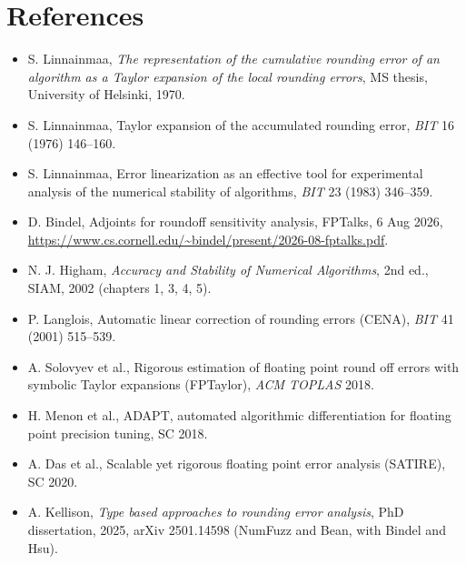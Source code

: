\documentclass[11pt]{article}
\begin{document}
\section*{References}
\begin{itemize}
\item S. Linnainmaa, \emph{The representation of the cumulative rounding error of an algorithm as a Taylor expansion of the local rounding errors}, MS thesis, University of Helsinki, 1970.
\item S. Linnainmaa, Taylor expansion of the accumulated rounding error, \emph{BIT} 16 (1976) 146--160.
\item S. Linnainmaa, Error linearization as an effective tool for experimental analysis of the numerical stability of algorithms, \emph{BIT} 23 (1983) 346--359.
\item D. Bindel, Adjoints for roundoff sensitivity analysis, FPTalks, 6 Aug 2026, \url{https://www.cs.cornell.edu/~bindel/present/2026-08-fptalks.pdf}.
\item N. J. Higham, \emph{Accuracy and Stability of Numerical Algorithms}, 2nd ed., SIAM, 2002 (chapters 1, 3, 4, 5).
\item P. Langlois, Automatic linear correction of rounding errors (CENA), \emph{BIT} 41 (2001) 515--539.
\item A. Solovyev et al., Rigorous estimation of floating point round off errors with symbolic Taylor expansions (FPTaylor), \emph{ACM TOPLAS} 2018.
\item H. Menon et al., ADAPT, automated algorithmic differentiation for floating point precision tuning, SC 2018.
\item A. Das et al., Scalable yet rigorous floating point error analysis (SATIRE), SC 2020.
\item A. Kellison, \emph{Type based approaches to rounding error analysis}, PhD dissertation, 2025, arXiv 2501.14598 (NumFuzz and Bean, with Bindel and Hsu).
\end{itemize}
\end{document}
